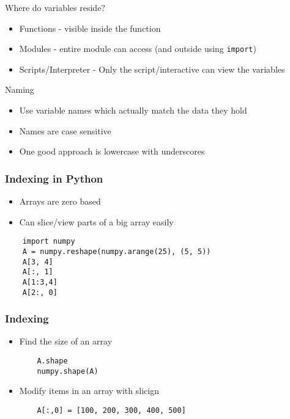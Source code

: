 \documentclass[11pt,professionalfonts]{beamer}
\begin{document}
\begin{frame}{Where do variables reside?}
    \begin{itemize}
        \item Functions - visible inside the function
        \item Modules - entire module can access (and outside using \texttt{import})
        \item Scripts/Interpreter - Only the script/interactive can view the variables
    \end{itemize}
\end{frame}

\begin{frame}{Naming}
    \begin{itemize}
        \item Use variable names which actually match the data they hold
        \item Names are case sensitive
        \item One good approach is lowercase with underscores
    \end{itemize}
\end{frame}

\begin{frame}[fragile]\frametitle{Indexing in Python}
    \begin{itemize}
        \item Arrays are zero based
        \item Can slice/view parts of a big array easily
    \end{itemize}
    \begin{verbatim}
    import numpy
    A = numpy.reshape(numpy.arange(25), (5, 5))
    A[3, 4]
    A[:, 1]
    A[1:3,4]
    A[2:, 0]
    \end{verbatim}
\end{frame}

\begin{frame}[fragile]\frametitle{Indexing}
    \begin{itemize}
        \item Find the size of an array
    \begin{verbatim}
    A.shape
    numpy.shape(A)
    \end{verbatim}
\item Modify items in an array with slicign
    \begin{verbatim}
    A[:,0] = [100, 200, 300, 400, 500]
    \end{verbatim}
    \end{itemize}
\end{frame}
\end{document}
